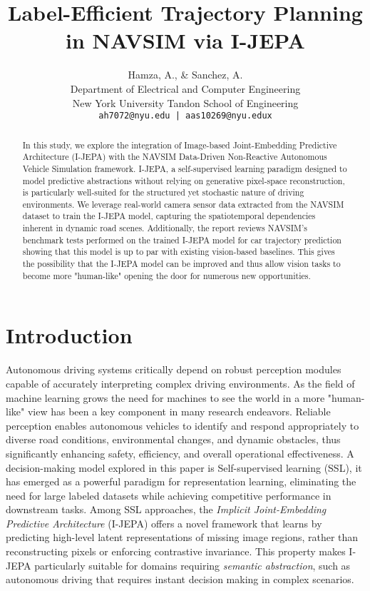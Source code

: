 \documentclass{article}
\title{Label-Efficient Trajectory Planning in NAVSIM via I-JEPA}
\author{
    Hamza, A., \& Sanchez, A. \\
    Department of Electrical and Computer Engineering \\
    New York University Tandon School of Engineering \\
    \texttt{ah7072@nyu.edu | aas10269@nyu.edux}
}
\begin{document}
\maketitle

\begin{abstract}
 In this study, we explore the integration of Image-based Joint-Embedding Predictive Architecture (I-JEPA) with the NAVSIM Data-Driven Non-Reactive Autonomous Vehicle Simulation framework. I-JEPA, a self-supervised learning paradigm designed to model predictive abstractions without relying on generative pixel-space reconstruction, is particularly well-suited for the structured yet stochastic nature of driving environments. We leverage real-world camera sensor data extracted from the NAVSIM dataset to train the I-JEPA model, capturing the spatiotemporal dependencies inherent in dynamic road scenes. Additionally, the report reviews NAVSIM's benchmark tests performed on the trained I-JEPA model for car trajectory prediction showing that this model is up to par with existing vision-based baselines. This gives the possibility that the I-JEPA model can be improved and thus allow vision tasks to become more "human-like" opening the door for numerous new opportunities. 
\end{abstract}

\section{Introduction}
Autonomous driving systems critically depend on robust perception modules capable of accurately interpreting complex driving environments. As the field of machine learning grows the need for machines to see the world in a more "human-like" view has been a key component in many research endeavors. 
Reliable perception enables autonomous vehicles to identify and respond appropriately to diverse road conditions, environmental changes, and dynamic obstacles, thus significantly enhancing safety, efficiency, and overall operational effectiveness. A decision-making model explored in this paper is Self-supervised learning (SSL), it has emerged as a powerful paradigm for representation learning, eliminating the need for large labeled datasets while achieving competitive performance in downstream tasks. Among SSL approaches, the \textit{Implicit Joint-Embedding Predictive Architecture} (I-JEPA) offers a novel framework that learns by predicting high-level latent representations of missing image regions, rather than reconstructing pixels or enforcing contrastive invariance. This property makes I-JEPA particularly suitable for domains requiring \textit{semantic abstraction}, such as autonomous driving that requires instant decision making in complex scenarios.
\end{document}

